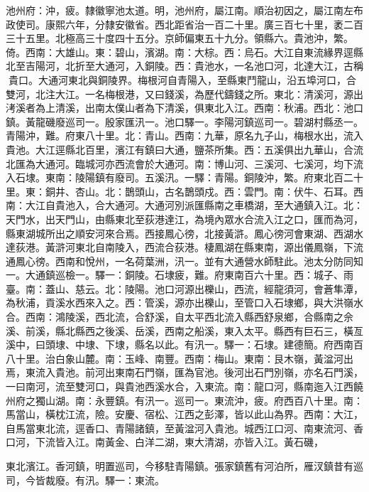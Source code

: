 \begin{pinyinscope}
池州府：沖，疲。隸徽寧池太道。明，池州府，屬江南。順治初因之，屬江南左布政使司。康熙六年，分隸安徽省。西北距省治一百二十里。廣三百七十里，袤二百三十五里。北極高三十度四十五分。京師偏東五十九分。領縣六。貴池沖，繁。倚。西南：大雄山。東：碧山，濱湖。南：大棕。西：烏石。大江自東流緣界逕縣北至吉陽河，北折至大通河，入銅陵。西：貴池水，一名池口河，北達大江，古稱貴口。大通河東北與銅陵界。梅根河自青陽入，至縣東鬥龍山，沿五埠河口，合雙河，北注大江。一名梅根港，又曰錢溪，為歷代鑄錢之所。東北：清溪河，源出洘溪者為上清溪，出南太僕山者為下清溪，俱東北入江。西南：秋浦。西北：池口鎮。黃龍磯廢巡司一。殷家匯汛一。池口驛一。李陽河鎮巡司一。碧湖村縣丞一。青陽沖，難。府東八十里。北：青山。西南：九華，原名九子山，梅根水出，流入貴池。大江逕縣北百里，濱江有鎮曰大通，鹽茶所集。西：五溪俱出九華山，合流北匯為大通河。臨城河亦西流會於大通河。南：博山河、三溪河、七溪河，均下流入石埭。東南：陵陽鎮有廢司。五溪汛。一驛：青陽。銅陵沖，繁。府東北百二十里。東：銅井、杏山。北：鵲頭山，古名鵲頭戍。西：雲門。南：伏牛、石耳。西南：大江自貴池入，合大通河。大通河別派匯縣南之車橋湖，至大通鎮入江。北：天門水，出天門山，由縣東北至荻港達江，為境內眾水合流入江之口，匯而為河，縣東湖城所出之順安河來合焉。西接鳳心徬，北接黃滸。鳳心徬河會東湖、西湖水達荻港。黃滸河東北自南陵入，西流合荻港。棲鳳湖在縣東南，源出儀鳳嶺，下流通鳳心徬。西南和悅州，一名荷葉洲，汛一。並有大通營水師駐此。池太分防同知一。大通鎮巡檢一。驛一：銅陵。石埭疲，難。府東南百六十里。西：城子、雨臺。南：蓋山、慈云。北：陵陽。池口河源出櫟山，西流，經龍須河，會蒼隼潭，為秋浦，貢溪水西來入之。西：管溪，源亦出櫟山，至管口入石埭鄉，與大洪嶺水合。西南：鴻陵溪，西北流，合舒溪，自太平西北流入縣西舒泉鄉，合縣南之佘溪、前溪，縣北縣西之後溪、岳溪，西南之船溪，東入太平。縣西有巨石三，橫亙溪中，曰頭埭、中埭、下埭，縣名以此。有汛一。驛一：石埭。建德簡。府西南百八十里。治白象山麓。南：玉峰、南豐。西南：梅山。東南：艮木嶺，黃湓河出焉，東流入貴池。前河出東南石門嶺，匯為官池。後河出石門別嶺，亦名石門溪，一曰南河，流至雙河口，與貴池西溪水合，入東流。南：龍口河，縣南迤入江西饒州府之獨山湖。南：永豐鎮。有汛一。巡司一。東流沖，疲。府西百八十里。南：馬當山，橫枕江流，險。安慶、宿松、江西之彭澤，皆以此山為界。西南：大江，自馬當東北流，逕香口、青陽諸鎮，至黃湓河入貴池。城西江口河、南東流河、香口河，下流皆入江。南黃金、白洋二湖，東大清湖，亦皆入江。黃石磯，

東北濱江。香河鎮，明置巡司，今移駐青陽鎮。張家鎮舊有河泊所，雁汊鎮昔有巡司，今皆裁廢。有汛。驛一：東流。


\end{pinyinscope}
